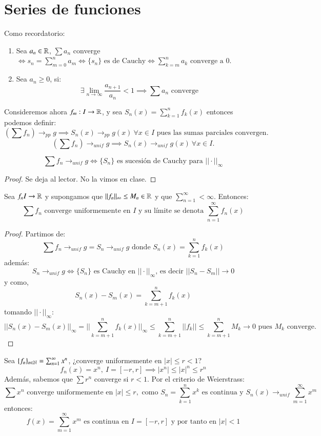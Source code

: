 \section{Series de funciones}
Como recordatorio:
\begin{enumerate}
    \item Sea $a_n \in \mathbb{R}$, $\sum a_n$ converge $\iff s_n = \sum_{m=0}^n a_m \iff \{s_n\} \text{ es de Cauchy} \iff \sum_{k=m}^n a_k \text{ converge a } 0$.
    \item Sea $a_n \geq 0$, si:
    $$
        \exists \lim_{n \to \infty} \frac{a_{n+1}}{a_n} < 1 \implies \sum a_n \text{ converge}
    $$
\end{enumerate}
Consideremos ahora $f_m : I \to \mathbb{R}$, y sea $S_n(x) = \sum_{k=1}^n f_k(x)$  entonces podemos definir:
$$
    \left(\sum f_n\right) \to_{pp} g \implies  S_n(x)\to_{pp} g(x)\ \forall x \in I \text{ pues las sumas parciales convergen.}
$$
$$
    \left(\sum f_n\right) \to_{unif} g \implies S_n(x) \to_{unif} g(x)\ \forall x \in I.
$$
\begin{pro}
    $$
        \sum f_n \to_{unif} g \iff \{S_n\} \text{ es sucesión de Cauchy para $||\cdot||_\infty$}
    $$
\end{pro}
\begin{proof}
    Se deja al lector. No la vimos en clase.
\end{proof}
\begin{pro}
    Sea $f_n I \to \mathbb{R}$ y supongamos que $||f_n||_\infty \leq M_n \in \mathbb{R}$  y que $\sum_{n=1}^\infty < \infty$. Entonces:
    $$
        \sum f_n \text{ converge uniformemente en $I$ y su límite se denota } \sum_{n=1}^\infty f_n(x)
    $$
\end{pro}
\begin{proof}
    Partimos de:
    $$
        \sum f_n \to_{unif} g = S_n \to_{unif} g \text{ donde } S_n(x) = \sum_{k=1}^n f_k(x)
    $$
    además:
    $$
        S_n \to_{unif} g \iff \{S_n\} \text{ es Cauchy en $|| \cdot ||_\infty$, es decir } ||S_n - S_m || \to 0
    $$
    y como,
    $$
        S_n(x) - S_m(x) = \sum_{k=m+1}^n f_k(x)
    $$
    tomando $||\cdot||_\infty$:
    $$
        ||S_n(x) - S_m(x)||_\infty = ||\sum_{k=m+1}^n f_k(x)||_\infty \leq \sum_{k=m+1}^{n} ||f_k|| \leq \sum_{k=m+1}^{n} M_k \to 0 \text{ pues $M_k$ converge.}
    $$
\end{proof}
\begin{eg}
    Sea $\{f_n\}_{n\in\mathbb{N}} = \sum_{n=1}^\infty x^n$, ¿converge uniformemente en $|x| \leq r < 1$?\\
    $$
        f_n(x) = x^n,\ I = [-r, r] \implies |x^n| \leq |x|^n \leq r^n
    $$
    Además, sabemos que $\sum r^n$ converge si $r<1$.
    Por el criterio de Weierstrass:
    $$
        \sum x^n \text{ converge uniformemente en } |x| \leq r, \text{ como } S_n=\sum_{k=1}^n x^k \text{ es continua y } S_n(x) \to_{unif} \sum_{m=1}^\infty x^m
    $$
    entonces:
    $$
        f(x) = \sum_{m=1}^{\infty} x^m \text{ es continua en } I = [-r, r] \text{ y por tanto en } |x| < 1
    $$
\end{eg}

